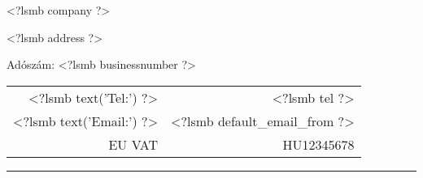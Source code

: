 \parbox{\textwidth}{%
  \parbox[b]{.42\textwidth}{%
    <?lsmb company ?>

    <?lsmb address ?>

    Adószám: <?lsmb businessnumber ?>

  }
  \parbox[b]{.2\textwidth}{
  }\hfill
  \begin{tabular}[b]{rr@{}}
  <?lsmb text('Tel:') ?> & <?lsmb tel ?>\\
  <?lsmb text('Email:') ?> & <?lsmb default_email_from ?>\\
    EU VAT & HU12345678
  \end{tabular}

  \rule[1.5em]{\textwidth}{0.5pt}
}

